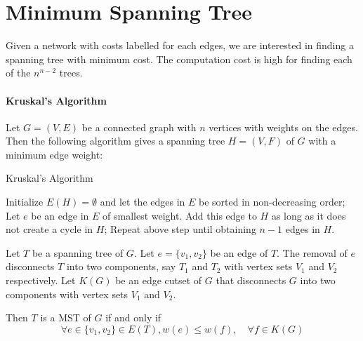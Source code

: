 \section{Minimum Spanning Tree}
Given a network with costs labelled for each edges, we are interested in finding a spanning tree with minimum cost. The computation cost is high for finding each of the $n^{n-2}$ trees.

\paragraph{Kruskal’s Algorithm}
Let $G=(V,E)$ be a connected graph with $n$ vertices with weights on the edges. Then the following algorithm gives a spanning tree $H=(V,F)$ of $G$ with a minimum edge weight:

\begin{algorithm}[htb] 
\caption{Kruskal’s Algorithm} 
\label{alg:SM} 
\begin{algorithmic}[1] %
\STATE 
Initialize $E(H)=\emptyset$ and let the edges in $E$ be sorted in non-decreasing order;
\STATE
Let $e$ be an edge in $E$ of smallest weight. Add this edge to $H$ as long as it does not create a cycle in $H$;
\STATE
Repeat above step until obtaining $n-1$ edges in $H$.
\end{algorithmic}
\end{algorithm}


\begin{theorem}
Let $T$ be a spanning tree of $G$.
Let $e=\{v_1,v_2\}$ be an edge of $T$.
The removal of $e$ disconnects $T$ into two components, say $T_1$ and $T_2$ with vertex sets $V_1$ and $V_2$ respectively.
Let $K(G)$ be an edge cutset of $G$ that disconnects $G$ into two components with vertex sets $V_1$ and $V_2$.

Then $T$ is a MST of $G$ if and only if
\[
\forall e\in\{v_1,v_2\}\in E(T),
w(e)\le w(f),\quad\forall f\in K(G)
\]
\end{theorem}

